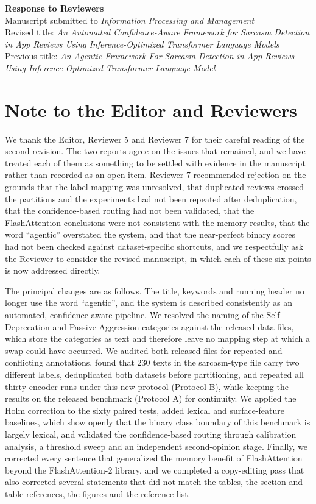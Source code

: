 \documentclass[11pt,a4paper]{article}
\begin{document}
\begin{center}
{\Large\bfseries Response to Reviewers}\\[0.6em]
{\large Manuscript submitted to \textit{Information Processing and Management}}\\[0.6em]
{\normalsize Revised title: \textit{An Automated Confidence-Aware Framework for Sarcasm Detection in App Reviews Using Inference-Optimized Transformer Language Models}}\\[0.3em]
{\normalsize Previous title: \textit{An Agentic Framework For Sarcasm Detection in App Reviews Using Inference-Optimized Transformer Language Model}}
\end{center}

\section*{Note to the Editor and Reviewers}

We thank the Editor, Reviewer 5 and Reviewer 7 for their careful reading of the second revision. The two reports agree on the issues that remained, and we have treated each of them as something to be settled with evidence in the manuscript rather than recorded as an open item. Reviewer 7 recommended rejection on the grounds that the label mapping was unresolved, that duplicated reviews crossed the partitions and the experiments had not been repeated after deduplication, that the confidence-based routing had not been validated, that the FlashAttention conclusions were not consistent with the memory results, that the word ``agentic'' overstated the system, and that the near-perfect binary scores had not been checked against dataset-specific shortcuts, and we respectfully ask the Reviewer to consider the revised manuscript, in which each of these six points is now addressed directly.

The principal changes are as follows. The title, keywords and running header no longer use the word ``agentic'', and the system is described consistently as an automated, confidence-aware pipeline. We resolved the naming of the Self-Deprecation and Passive-Aggression categories against the released data files, which store the categories as text and therefore leave no mapping step at which a swap could have occurred. We audited both released files for repeated and conflicting annotations, found that 230 texts in the sarcasm-type file carry two different labels, deduplicated both datasets before partitioning, and repeated all thirty encoder runs under this new protocol (Protocol B), while keeping the results on the released benchmark (Protocol A) for continuity. We applied the Holm correction to the sixty paired tests, added lexical and surface-feature baselines, which show openly that the binary class boundary of this benchmark is largely lexical, and validated the confidence-based routing through calibration analysis, a threshold sweep and an independent second-opinion stage. Finally, we corrected every sentence that generalized the memory benefit of FlashAttention beyond the FlashAttention-2 library, and we completed a copy-editing pass that also corrected several statements that did not match the tables, the section and table references, the figures and the reference list.
\end{document}

